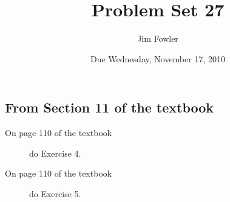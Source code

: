 \documentclass[12pt]{handout}
\author{Jim Fowler}
\title{Problem Set 27}
\date{Due Wednesday, November 17, 2010}
\begin{document}
\maketitle










\subsection*{From Section 11 of the textbook}



\begin{description}

\item[On page 110 of the textbook] do Exercise 4.

\item[On page 110 of the textbook] do Exercise 5.

\end{description}
\end{document}
